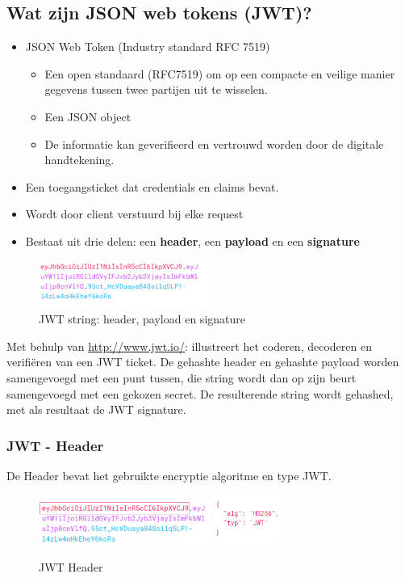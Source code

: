 \documentclass{article}
\newcommand{\bold}[1]{\textbf{#1}}
\begin{document}
\subsection{Wat zijn JSON web tokens (JWT)?}
\begin{itemize}
    \item JSON Web Token (Industry standard RFC 7519)
    \begin{itemize}
        \item Een open standaard (RFC7519) om op een compacte en veilige manier gegevens
        tussen twee partijen uit te wisselen.
        \item Een JSON object 
        \item De informatie kan geverifieerd en vertrouwd worden door de digitale handtekening.
    \end{itemize}
    \item Een toegangsticket dat credentials en claims bevat.
    \item Wordt door client verstuurd bij elke request
    \item Bestaat uit drie delen: een \bold{header}, een \bold{payload} en een \bold{signature}
\end{itemize}

\begin{figure}[H]
    \centering
    \includegraphics[width=0.5\textwidth]{img/jwt.png}
    \caption{JWT string: header, payload en signature}
\end{figure}

Met behulp van \url{http://www.jwt.io/}: illustreert het coderen, decoderen en verifiëren van een JWT ticket.
De gehashte header en gehashte payload worden samengevoegd met een punt tussen, die string wordt dan op zijn beurt samengevoegd met een gekozen secret.
De resulterende string wordt gehashed, met als resultaat de JWT signature. 

\subsubsection{JWT - Header}
De Header bevat het gebruikte encryptie algoritme en type JWT.

\begin{figure}[H]
    \centering
    \includegraphics[width=0.5\textwidth]{img/jwt2.png}
    \includegraphics[width=0.2\textwidth]{img/jwt3.png}
    \caption{JWT Header}
\end{figure}
\end{document}

